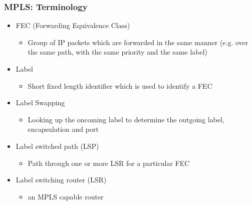 \documentclass[12pt]{beamer}
\begin{document}
\begin{frame}
	\frametitle{MPLS: Terminology}
	
	\begin{itemize}
		\item FEC (Forwarding Equivalence Class)
			\begin{itemize}
				\item Group of IP packets which are forwarded in the same manner (e.g. over the same path, with the same priority and the same label)
			\end{itemize}
			
		\item Label
			\begin{itemize}
				\item Short fixed length identifier which is used to identify a FEC
			\end{itemize}						
			
		\item Label Swapping
			\begin{itemize}
				\item Looking up the oncoming label to determine the outgoing label, encapsulation and port
			\end{itemize}
			
		\item Label switched path (LSP)
			\begin{itemize}
				\item Path through one or more LSR for a particular FEC
			\end{itemize}
		\item Label switching router (LSR)
			\begin{itemize}
				\item an MPLS capable router
			\end{itemize}
			
			
	\end{itemize}

\end{frame}
\end{document}
